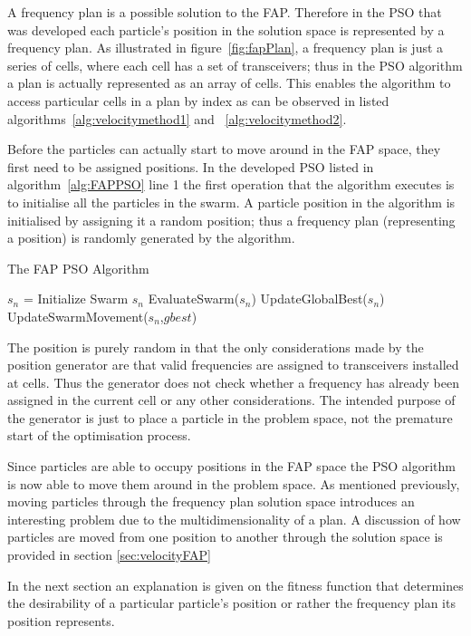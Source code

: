 A frequency plan is a possible solution to the \gls{FAP}. Therefore in the \gls{PSO} that was developed each particle's position in the solution space is represented by a frequency plan. As illustrated in figure~\ref{fig:fapPlan}, a frequency plan is just a series of cells, where each cell has a set of transceivers; thus in the \gls{PSO} algorithm a plan is actually represented as an array of cells. This enables the algorithm to access particular cells in a plan by index as can be observed in listed algorithms~\ref{alg:velocitymethod1} and ~\ref{alg:velocitymethod2}. 

Before the particles can actually start to move around in the \gls{FAP} space, they first need to be assigned positions. In the developed \gls{PSO} listed in algorithm~\ref{alg:FAPPSO} line 1 the first operation that the algorithm executes is to initialise all the particles in the swarm. A particle position in the algorithm is initialised by assigning it a random position; thus a frequency plan (representing a position) is randomly generated by the algorithm.
\begin{algorithm}[H]
\label{alg:FAPPSO}
\caption{The \gls{FAP} \gls{PSO} Algorithm}
\begin{algorithmic}
\State $s_n$ = Initialize Swarm $s_n$
	\State EvaluateSwarm($s_n$)
	\State UpdateGlobalBest($s_n$)
	\State UpdateSwarmMovement($s_n$,$gbest$)
\EndWhile
\end{algorithmic}
\end{algorithm}


The position is purely random in that the only considerations made by the position generator are that valid frequencies are assigned to transceivers installed at cells. Thus the generator does not check whether a frequency has already been assigned in the current cell or any other considerations. The intended purpose of the generator is just to place a particle in the problem space, not the premature start of the optimisation process.

Since particles are able to occupy positions in the \gls{FAP} space the \gls{PSO} algorithm is now able to move them around in the problem space. As mentioned previously, moving particles through the frequency plan solution space introduces an interesting problem due to the multidimensionality of a plan. A discussion of how particles are moved from one position to another through the solution space is provided in section \ref{sec:velocityFAP}

In the next section an explanation is given on the fitness function that determines the desirability of a particular particle's position or rather the frequency plan its position represents.
